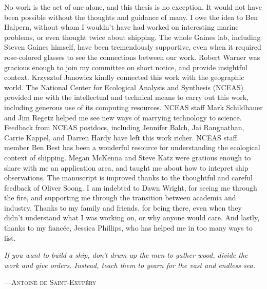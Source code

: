   \approvalpage 
  \copyrightpage


  \begin{acknowledgements}

    No work is the act of one alone, and this thesis is no exception. It would not have been possible without the thoughts and guidance of many. I owe the idea to Ben Halpern, without whom I wouldn't have had worked on interesting marine problems, or even thought twice about shipping. The whole Gaines lab, including Steven Gaines himself, have been tremendously supportive, even when it required rose-colored glasses to see the connections between our work. Robert Warner was gracious enough to join my committee on short notice, and provide insightful context. Krzysztof Janowicz kindly connected this work with the geographic world. The National Center for Ecological Analysis and Synthesis (NCEAS) provided me with the intellectual and technical means to carry out this work, including generous use of its computing resources. NCEAS staff Mark Schildhauer and Jim Regetz helped me see new ways of marrying technology to science. Feedback from NCEAS postdocs, including Jennifer Balch, Jai Rangnathan, Carrie Kappel, and Darren Hardy have left this work richer. NCEAS staff member Ben Best has been a wonderful resource for understanding the ecological context of shipping. Megan McKenna and Steve Katz were gratious enough to share with me an application area, and taught me about how to intepret ship observations. The manuscript is improved thanks to the thoughtful and careful feedback of Oliver Soong. I am indebted to Dawn Wright, for seeing me through the fire, and supporting me through the transition between academia and industry. Thanks to my family and friends, for being there, even when they didn't understand what I was working on, or why anyone would care. And lastly, thanks to my fiancée, Jessica Phillips, who has helped me in too many ways to list.

    \setlength{\epigraphwidth}{.9\textwidth}
    \setlength{\epigraphrule}{0pt}
    \epigraph{\textit{If you want to build a ship, don't drum up the men to gather wood, divide the work and give orders. Instead, teach them to yearn for the vast and endless sea.}}
             {---\textsc{Antoine de Saint-Exupéry}}
  \end{acknowledgements}
\ssp

